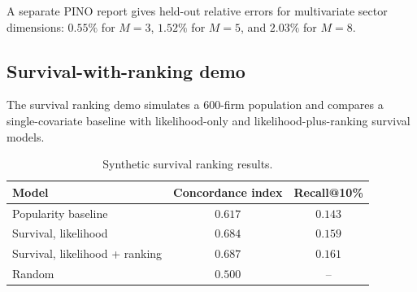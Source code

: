 \documentclass[11pt]{article}
\theoremstyle{plain}
\theoremstyle{definition}
\theoremstyle{remark}
\begin{document}
\begin{table}[h]
\centering
\caption{Repository-reported learned MBPP solver results.}
\label{tab:pino}
\end{table}

A separate PINO report gives held-out relative errors for multivariate sector dimensions: $0.55\%$ for $M=3$, $1.52\%$ for $M=5$, and $2.03\%$ for $M=8$.

\subsection{Survival-with-ranking demo}
The survival ranking demo simulates a 600-firm population and compares a single-covariate baseline with likelihood-only and likelihood-plus-ranking survival models.

\begin{table}[h]
\centering
\caption{Synthetic survival ranking results.}
\label{tab:survival}
\begin{tabular}{@{}lcc@{}}
\toprule
Model & Concordance index & Recall@10\% \\
\midrule
Popularity baseline & $0.617$ & $0.143$ \\
Survival, likelihood & $0.684$ & $0.159$ \\
Survival, likelihood + ranking & $0.687$ & $0.161$ \\
Random & $0.500$ & -- \\
\bottomrule
\end{tabular}
\end{table}
\end{document}
